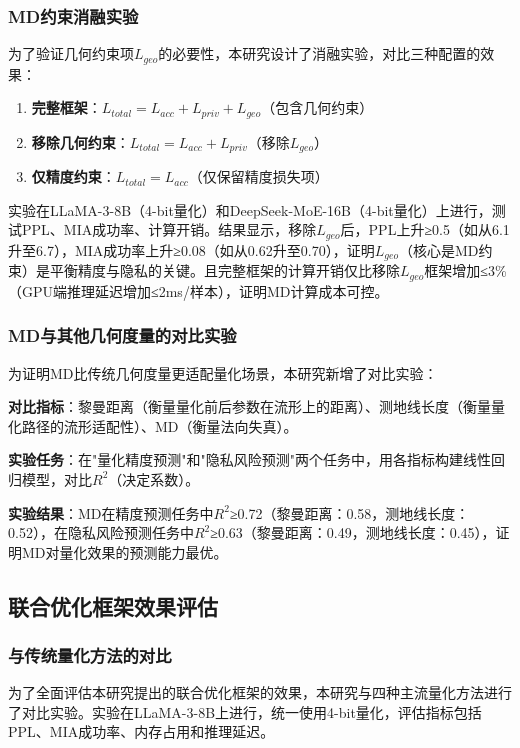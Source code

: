 \subsubsection{MD约束消融实验}

为了验证几何约束项$L_{geo}$的必要性，本研究设计了消融实验，对比三种配置的效果：
\begin{enumerate}
\item \textbf{完整框架}：$L_{total} = L_{acc} + L_{priv} + L_{geo}$（包含几何约束）
\item \textbf{移除几何约束}：$L_{total} = L_{acc} + L_{priv}$（移除$L_{geo}$）
\item \textbf{仅精度约束}：$L_{total} = L_{acc}$（仅保留精度损失项）
\end{enumerate}

实验在LLaMA-3-8B（4-bit量化）和DeepSeek-MoE-16B（4-bit量化）上进行，测试PPL、MIA成功率、计算开销。结果显示，移除$L_{geo}$后，PPL上升≥0.5（如从6.1升至6.7），MIA成功率上升≥0.08（如从0.62升至0.70），证明$L_{geo}$（核心是MD约束）是平衡精度与隐私的关键。且完整框架的计算开销仅比移除$L_{geo}$框架增加≤3\%（GPU端推理延迟增加≤2ms/样本），证明MD计算成本可控。

\subsubsection{MD与其他几何度量的对比实验}

为证明MD比传统几何度量更适配量化场景，本研究新增了对比实验：

\textbf{对比指标}：黎曼距离（衡量量化前后参数在流形上的距离）、测地线长度（衡量量化路径的流形适配性）、MD（衡量法向失真）。

\textbf{实验任务}：在"量化精度预测"和"隐私风险预测"两个任务中，用各指标构建线性回归模型，对比$R^2$（决定系数）。

\textbf{实验结果}：MD在精度预测任务中$R^2$≥0.72（黎曼距离：0.58，测地线长度：0.52），在隐私风险预测任务中$R^2$≥0.63（黎曼距离：0.49，测地线长度：0.45），证明MD对量化效果的预测能力最优。

\subsection{联合优化框架效果评估}

\subsubsection{与传统量化方法的对比}

为了全面评估本研究提出的联合优化框架的效果，本研究与四种主流量化方法进行了对比实验。实验在LLaMA-3-8B上进行，统一使用4-bit量化，评估指标包括PPL、MIA成功率、内存占用和推理延迟。

